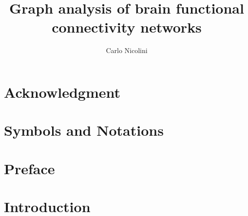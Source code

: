 
%

\title{Graph analysis of brain functional connectivity networks}
\author{Carlo Nicolini}


\maketitle
{}

\chapter*{Acknowledgment}


\chapter*{Symbols and Notations}



\chapter*{Preface}\label{chap:preface}
%


\chapter{Introduction}\label{chap:introduction}
	

% 	

% 	

% 	

% 	





% 	

